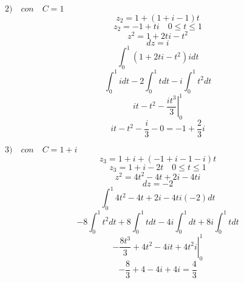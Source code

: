 \documentclass{article}
\begin{document}
\(2) \quad con\quad C= 1 \) 
\begin{equation}
z_2=1+(1+i-1)t
\end{equation}
\begin{equation}
z_2=-1+ti \quad 0\leq t \leq 1
\end{equation}
\begin{equation}
z^2=1+2ti-t^2
\end{equation}
\begin{equation}
dz=i
\end{equation}
\begin{equation}
\int_{0}^{1} (1+2ti-t^2)idt
\end{equation}
\begin{equation}
\int_{0}^{1} idt -2\int_{0}^{1} tdt -i\int_{0}^{1}t^2dt
\end{equation}
\begin{equation}
\left.it-t^2-\frac{it^3}{3} \right|_{0}^{1}
\end{equation}
\begin{equation}
it-t^2-\frac{i}{3}-0=-1+\frac{2}{3}i
\end{equation}


\(3)\quad con\quad C= 1+i \) 
\begin{equation}
z_3=1+i+(-1+i-1-i)t
\end{equation}
\begin{equation}
z_3=1+i-2t \quad 0\leq t \leq 1
\end{equation}
\begin{equation}
z^2=4t^2-4t+2i-4ti
\end{equation}
\begin{equation}
dz=-2
\end{equation}
\begin{equation}
\int_{0}^{1} 4t^2-4t+2i-4ti(-2)dt
\end{equation}
\begin{equation}
-8\int_{0}^{1} t^2dt +8\int_{0}^{1} tdt -4i\int_{0}^{1}dt+8i\int_{0}^{1}tdt
\end{equation}
\begin{equation}
\left.-\frac{8t^3}{3} +4t^2-4it+4t^2i\right|_{0}^{1}
\end{equation}
\begin{equation}
-\frac{8}{3}+4-4i+4i=\frac{4}{3}
\end{equation}
\end{document}
